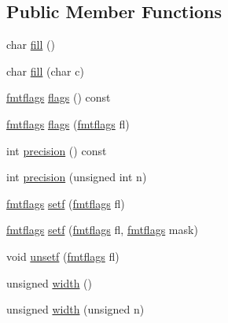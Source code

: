 \subsection*{Public Member Functions}
\begin{DoxyCompactItemize}
\item 
char \hyperlink{classios__base_a31010e883c6df0ebbb535b97c8fd7773}{fill} ()
\item 
char \hyperlink{classios__base_a0ee1d65c665bd08fe38b65c2df8f6d8c}{fill} (char c)
\item 
\hyperlink{classios__base_a975a829c0b5d999dd5bce3758b59da10}{fmtflags} \hyperlink{classios__base_a96aee8eabffaefc55e84549f61b3b838}{flags} () const 
\item 
\hyperlink{classios__base_a975a829c0b5d999dd5bce3758b59da10}{fmtflags} \hyperlink{classios__base_a171cf59acb00e530dc04ef31da55540f}{flags} (\hyperlink{classios__base_a975a829c0b5d999dd5bce3758b59da10}{fmtflags} fl)
\item 
int \hyperlink{classios__base_a27f092ced0bab73e8b77a1b633d430d2}{precision} () const 
\item 
int \hyperlink{classios__base_a551b5c00adacd54df64cd959da4533bd}{precision} (unsigned int n)
\item 
\hyperlink{classios__base_a975a829c0b5d999dd5bce3758b59da10}{fmtflags} \hyperlink{classios__base_a75901e35e6594b1a91dfd61fece1fd81}{setf} (\hyperlink{classios__base_a975a829c0b5d999dd5bce3758b59da10}{fmtflags} fl)
\item 
\hyperlink{classios__base_a975a829c0b5d999dd5bce3758b59da10}{fmtflags} \hyperlink{classios__base_ac60f27ae899c2b0ca2e198262f8c293d}{setf} (\hyperlink{classios__base_a975a829c0b5d999dd5bce3758b59da10}{fmtflags} fl, \hyperlink{classios__base_a975a829c0b5d999dd5bce3758b59da10}{fmtflags} mask)
\item 
void \hyperlink{classios__base_ae0d62ab5a729fda22db12bf5bc788256}{unsetf} (\hyperlink{classios__base_a975a829c0b5d999dd5bce3758b59da10}{fmtflags} fl)
\item 
unsigned \hyperlink{classios__base_a7a8740575fab72ac5dd67523bdf838e9}{width} ()
\item 
unsigned \hyperlink{classios__base_a973da4b3f59db2f4b022d8b6a1ef0236}{width} (unsigned n)
\end{DoxyCompactItemize}
